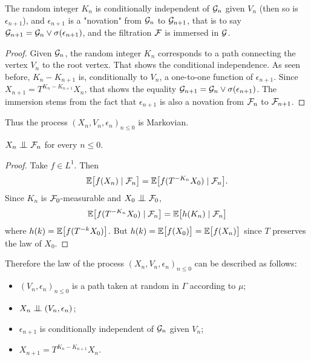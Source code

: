 \documentclass[12pt,a4paper]{article}
\begin{document}
\begin{lemma}
The random integer $K_n$ is conditionally independent of $\mathcal{G}_n$ 
given $V_n$ (then so is  $\epsilon_{n+1}$), and  $\epsilon_{n+1}$ is 
a "novation" from $\mathcal{G}_n$ to $\mathcal{G}_{n+1}$, that is 
to say $\mathcal{G}_{n+1} = \mathcal{G}_n \vee \sigma(\epsilon_{n+1})$, and  
the filtration $\mathcal{F}$ is immersed in $\mathcal{G}$. 
\end{lemma}

\begin{proof}
Given $\mathcal{G}_n$, the random integer $K_n$ corresponds to a path  
connecting the vertex $V_n$ to the root vertex. 
That shows the conditional independence. 
As seen before, $K_{n}-K_{n+1}$ is, conditionally to $V_n$, 
a one-to-one function of $\epsilon_{n+1}$. Since 
$X_{n+1} = T^{K_{n}-K_{n+1}}X_n$, that shows the equality 
$\mathcal{G}_{n+1} = \mathcal{G}_n \vee \sigma(\epsilon_{n+1})$. 
The immersion stems from the fact that 
 $\epsilon_{n+1}$ is also a novation from $\mathcal{F}_n$ to $\mathcal{F}_{n+1}$.  
\end{proof}

Thus the process ${(X_n, V_n, \epsilon_n)}_{n \leq 0}$ is Markovian. 


\begin{lemma}
$X_n \indep \FF_n$ for every $n \leq 0$.
\end{lemma}

\begin{proof}
Take $f \in L^1$. Then
$$
\mathbb{E}\bigl[ f(X_n) \mid \mathcal{F}_n\bigr] 
= \mathbb{E}\bigl[ f(T^{-K_n}X_0) \mid \mathcal{F}_n\bigr]. 
$$
Since $K_n$ is $\mathcal{F}_0$-measurable and $X_0 \indep \FF_0$, 
$$
\mathbb{E}\bigl[ f(T^{-K_n}X_0) \mid \mathcal{F}_n\bigr] = 
\mathbb{E}\bigl[ h(K_n) \mid \mathcal{F}_n\bigr]
$$
where $h(k) = \mathbb{E}\bigl[ f(T^{-k}X_0)\bigr]$. 
But $h(k) =   \mathbb{E}\bigl[ f(X_0)\bigr]=  \mathbb{E}\bigl[ f(X_n)\bigr]$ 
since $T$ preserves the law of $X_0$. 
\end{proof}

Therefore the law of the process ${(X_n,V_n,\epsilon_n)}_{n \leq 0}$ can 
be described as follows:
\begin{itemize}
\item ${(V_n,\epsilon_n)}_{n \leq 0}$ is a path taken at random in $\Gamma$ 
according to $\mu$;

\item $X_n \indep (V_n,\epsilon_n)$;

\item $\epsilon_{n+1}$ is conditionally independent of $\mathcal{G}_n$ given $V_n$;

\item $X_{n+1} = T^{K_n-K_{n+1}}X_n$.
\end{itemize}
\end{document}
